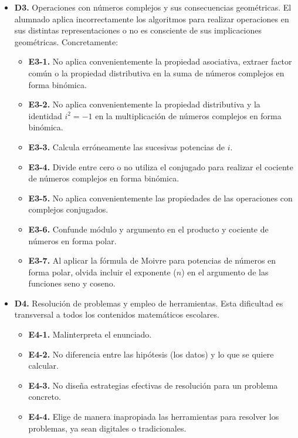 \documentclass[../main.tex]{memoir}
\begin{document}
\begin{itemize}
	\item \textbf{D3.} Operaciones con números complejos y sus consecuencias geométricas.
	El alumnado aplica incorrectamente los algoritmos para realizar operaciones en sus distintas representaciones o no es consciente de sus implicaciones geométricas. Concretamente:
	\begin{itemize}
		\item \textbf{E3-1.} No aplica convenientemente la propiedad asociativa, extraer factor común o la propiedad distributiva en la suma de números complejos en forma binómica.
		\item \textbf{E3-2.} No aplica convenientemente la propiedad distributiva y la identidad $i^2 = -1$ en la multiplicación de números complejos en forma binómica.
		\item \textbf{E3-3.} Calcula erróneamente las sucesivas potencias de $i$.
		\item \textbf{E3-4.} Divide entre cero o no utiliza el conjugado para realizar el cociente de números complejos en forma binómica.
		\item \textbf{E3-5.} No aplica convenientemente las propiedades de las operaciones con complejos conjugados.
		\item \textbf{E3-6.} Confunde módulo y argumento en el producto y cociente de números en forma polar.
		\item \textbf{E3-7.} Al aplicar la fórmula de Moivre para potencias de números en forma polar, olvida incluir el exponente ($n$) en el argumento de las funciones seno y coseno.
	\end{itemize}
	
	\item \textbf{D4.} Resolución de problemas y empleo de herramientas.
	Esta dificultad es transversal a todos los contenidos matemáticos escolares.
	\begin{itemize}
		\item \textbf{E4-1.} Malinterpreta el enunciado.
		\item \textbf{E4-2.} No diferencia entre las hipótesis (los datos) y lo que se quiere calcular.
		\item \textbf{E4-3.} No diseña estrategias efectivas de resolución para un problema concreto.
		\item \textbf{E4-4.} Elige de manera inapropiada las herramientas para resolver los problemas, ya sean digitales o tradicionales. 
	\end{itemize}


\end{itemize}
\end{document}
